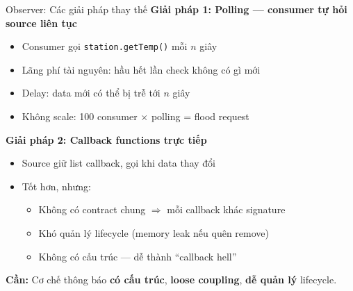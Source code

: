\begin{frame}[fragile]{Observer: Các giải pháp thay thế}
  \textbf{Giải pháp 1: Polling --- consumer tự hỏi source liên tục}
  \begin{itemize}
    \item Consumer gọi \texttt{station.getTemp()} mỗi $n$ giây
    \item \textcolor{myred}{Lãng phí tài nguyên}: hầu hết lần check không có gì mới
    \item \textcolor{myred}{Delay}: data mới có thể bị trễ tới $n$ giây
    \item \textcolor{myred}{Không scale}: 100 consumer $\times$ polling = flood request
  \end{itemize}

  \vspace{0.3em}
  \textbf{Giải pháp 2: Callback functions trực tiếp}
  \begin{itemize}
    \item Source giữ list callback, gọi khi data thay đổi
    \item \textcolor{myorange}{Tốt hơn}, nhưng:
    \begin{itemize}
      \item Không có contract chung $\Rightarrow$ mỗi callback khác signature
      \item Khó quản lý lifecycle (memory leak nếu quên remove)
      \item Không có cấu trúc --- dễ thành ``callback hell''
    \end{itemize}
  \end{itemize}

  \vspace{0.2em}
  \textcolor{myred}{\textbf{Cần:}} Cơ chế thông báo \textbf{có cấu trúc}, \textbf{loose coupling}, \textbf{dễ quản lý} lifecycle.
\end{frame}

